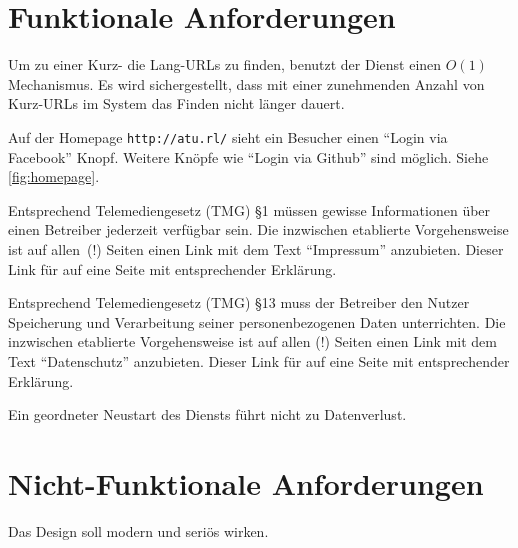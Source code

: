 \documentclass[parskip=full,11pt,twoside]{scrartcl}
\begin{document}
\section{Funktionale Anforderungen}


Um zu einer Kurz- die Lang-URLs zu finden,
benutzt der Dienst einen $O(1)$ Mechanismus.
Es wird sichergestellt,
dass mit einer zunehmenden Anzahl von Kurz-URLs im System
das Finden nicht länger dauert.


Auf der Homepage \texttt{http://atu.rl/} sieht ein Besucher
einen \enquote{Login via Facebook} Knopf.
Weitere Knöpfe wie \enquote{Login via Github} sind möglich.
Siehe \cref{fig:homepage}.


Entsprechend Telemediengesetz (TMG) §1
müssen gewisse Informationen über einen Betreiber jederzeit verfügbar sein.
Die inzwischen etablierte Vorgehensweise ist auf allen~(!) Seiten
einen Link mit dem Text \enquote{Impressum} anzubieten.
Dieser Link für auf eine Seite mit entsprechender Erklärung.


Entsprechend Telemediengesetz (TMG) §13
muss der Betreiber den Nutzer Speicherung und Verarbeitung seiner personenbezogenen Daten unterrichten.
Die inzwischen etablierte Vorgehensweise ist auf allen (!) Seiten
einen Link mit dem Text \enquote{Datenschutz} anzubieten.
Dieser Link für auf eine Seite mit entsprechender Erklärung.


Ein geordneter Neustart des Diensts führt nicht zu Datenverlust.

\section{Nicht-Funktionale Anforderungen}


Das Design soll modern und seriös wirken.
\end{document}
